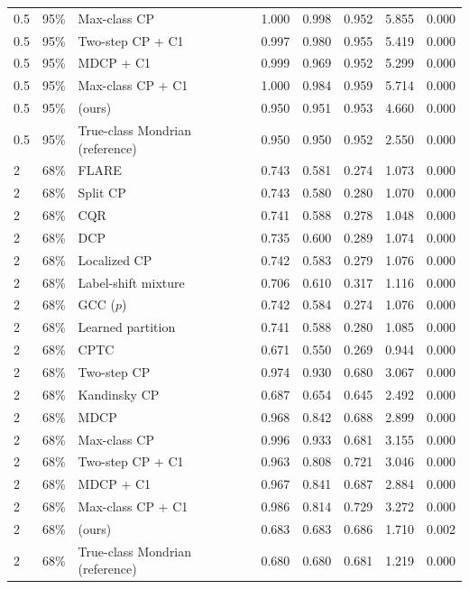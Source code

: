 \begin{longtable}{llp{4cm}ccccc}
0.5 & 95\% & Max-class CP & 1.000 & 0.998 & 0.952 & 5.855 & 0.000 \\
0.5 & 95\% & Two-step CP + C1 & 0.997 & 0.980 & 0.955 & 5.419 & 0.000 \\
0.5 & 95\% & MDCP + C1 & 0.999 & 0.969 & 0.952 & 5.299 & 0.000 \\
0.5 & 95\% & Max-class CP + C1 & 1.000 & 0.984 & 0.959 & 5.714 & 0.000 \\
0.5 & 95\% & \gamut{} (ours) & 0.950 & 0.951 & 0.953 & 4.660 & 0.000 \\
0.5 & 95\% & True-class Mondrian (reference) & 0.950 & 0.950 & 0.952 & 2.550 & 0.000 \\
\midrule
2 & 68\% & FLARE & 0.743 & 0.581 & 0.274 & 1.073 & 0.000 \\
2 & 68\% & Split CP & 0.743 & 0.580 & 0.280 & 1.070 & 0.000 \\
2 & 68\% & CQR & 0.741 & 0.588 & 0.278 & 1.048 & 0.000 \\
2 & 68\% & DCP & 0.735 & 0.600 & 0.289 & 1.074 & 0.000 \\
2 & 68\% & Localized CP & 0.742 & 0.583 & 0.279 & 1.076 & 0.000 \\
2 & 68\% & Label-shift mixture & 0.706 & 0.610 & 0.317 & 1.116 & 0.000 \\
2 & 68\% & GCC ($p$) & 0.742 & 0.584 & 0.274 & 1.076 & 0.000 \\
2 & 68\% & Learned partition & 0.741 & 0.588 & 0.280 & 1.085 & 0.000 \\
2 & 68\% & CPTC & 0.671 & 0.550 & 0.269 & 0.944 & 0.000 \\
2 & 68\% & Two-step CP & 0.974 & 0.930 & 0.680 & 3.067 & 0.000 \\
2 & 68\% & Kandinsky CP & 0.687 & 0.654 & 0.645 & 2.492 & 0.000 \\
2 & 68\% & MDCP & 0.968 & 0.842 & 0.688 & 2.899 & 0.000 \\
2 & 68\% & Max-class CP & 0.996 & 0.933 & 0.681 & 3.155 & 0.000 \\
2 & 68\% & Two-step CP + C1 & 0.963 & 0.808 & 0.721 & 3.046 & 0.000 \\
2 & 68\% & MDCP + C1 & 0.967 & 0.841 & 0.687 & 2.884 & 0.000 \\
2 & 68\% & Max-class CP + C1 & 0.986 & 0.814 & 0.729 & 3.272 & 0.000 \\
2 & 68\% & \gamut{} (ours) & 0.683 & 0.683 & 0.686 & 1.710 & 0.002 \\
2 & 68\% & True-class Mondrian (reference) & 0.680 & 0.680 & 0.681 & 1.219 & 0.000 \\

\end{longtable}
